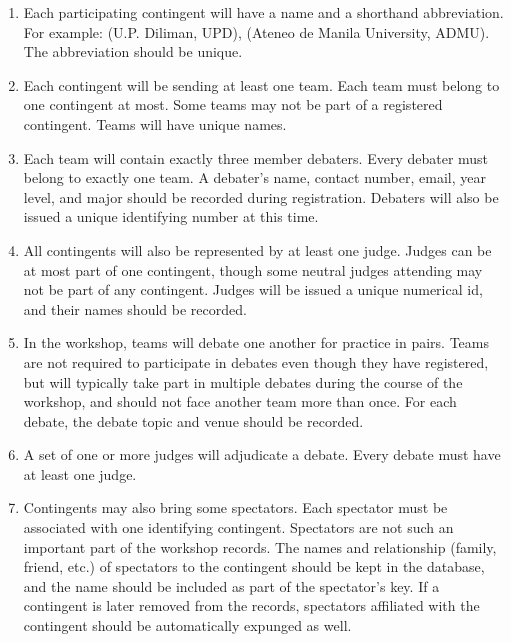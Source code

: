\documentclass[a4paper,12pt,leqno]{article}
\begin{document}
\begin{enumerate}

\item Each participating contingent will have a name and a shorthand abbreviation. For example: (U.P. Diliman, UPD), (Ateneo de Manila University, ADMU). The abbreviation should be unique.

\item Each contingent will be sending at least one team. Each team must belong to one contingent at most. Some teams may not be part of a registered contingent. Teams will have unique names. 

\item Each team will contain exactly three member debaters. Every debater must belong to exactly one team. A debater's name, contact number, email, year level,  and major should be recorded during registration. Debaters will also be issued a unique identifying number at this time. 

\item All contingents will also be represented by at least one judge. Judges can be at most part of one contingent, though some neutral judges attending may not be part of any contingent. Judges will be issued a unique numerical id, and their names should be recorded.

\item In the workshop, teams will debate one another for practice in pairs. Teams are not required to participate in debates even though they have registered, but will typically take part in multiple debates during the course of the workshop, and should not face another team more than once. For each debate, the debate topic and venue should be recorded.

\item A set of one or more judges will adjudicate a debate. Every debate must have at least one judge.

\item Contingents may also bring some spectators. Each spectator must be associated with one identifying contingent. Spectators are not such an important part of the workshop records. The names and relationship (family, friend, etc.) of spectators to the contingent should be kept in the database, and the name should be included as part of the spectator's key. If a contingent is later removed from the records, spectators affiliated with the contingent should be automatically expunged as well. 

\end{enumerate}
\end{document}
